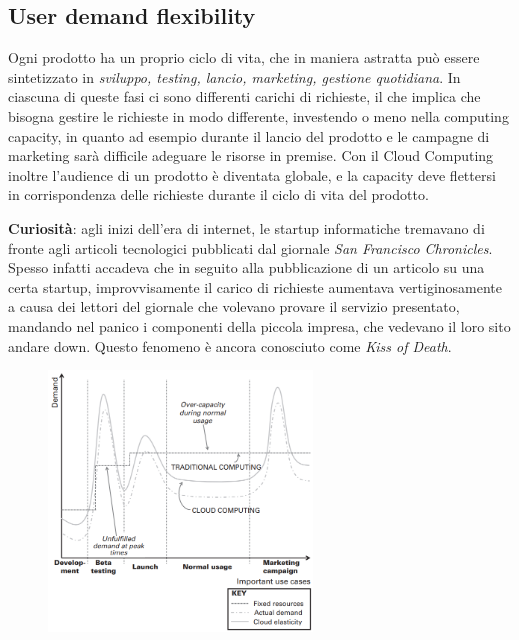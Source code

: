 \subsection{User demand flexibility}
Ogni prodotto ha un proprio ciclo di vita, che in maniera astratta può essere sintetizzato in \textit{sviluppo, testing, lancio, marketing, gestione quotidiana}. In ciascuna di queste fasi ci sono differenti carichi di richieste, il che implica che bisogna gestire le richieste in modo differente, investendo o meno nella computing capacity, in quanto ad esempio durante il lancio del prodotto e le campagne di marketing sarà difficile adeguare le risorse in premise. Con il Cloud Computing inoltre l'audience di un prodotto è diventata globale, e la capacity deve flettersi in corrispondenza delle richieste durante il ciclo di vita del prodotto.

\begin{mdframed}[backgroundcolor=gray!20,shadow=false]
\textbf{Curiosità}: agli inizi dell'era di internet, le startup informatiche tremavano di fronte agli articoli tecnologici pubblicati dal giornale \textit{San Francisco Chronicles}. Spesso infatti accadeva che in seguito alla pubblicazione di un articolo su una certa startup, improvvisamente il carico di richieste aumentava vertiginosamente a causa dei lettori del giornale che volevano provare il servizio presentato, mandando nel panico i componenti della piccola impresa, che vedevano il loro sito andare down. Questo fenomeno è ancora conosciuto come \textit{Kiss of Death}.
\end{mdframed}

\begin{figure}[htb!]
    \centering
    \includegraphics[width=7cm]{./Images/cap6/6.5.png}
\end{figure}

